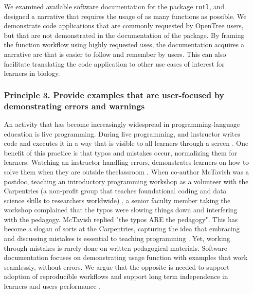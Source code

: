 \documentclass[12pt]{article}
\begin{document}
We examined available software documentation for the package \texttt{rotl}, and designed a narrative that requires the usage of as many functions as possible.
We demonstrate code applications that are commonly requested by OpenTree users, but that are not demonstrated in the documentation of the package.
By framing the function workflow using highly requested uses, the documentation acquires a narrative arc that is easier to follow and remember by users. This can also facilitate translating the code application to other use cases of interest for learners in biology.


\subsubsection*{Principle 3. Provide examples that are user-focused by demonstrating errors and warnings}


An activity that has become increasingly widespread in programming-language education is live programming. During live programming, and instructor writes code and executes it in a way that is visible to all learners through a screen \citep{guzdial2013lure, selvaraj2021live}.
One benefit of this practice is that typos and mistakes occur, normalizing them for learners. 
Watching an instructor handling errors, demonstrates learners on how to solve them when they are outside theclassroom \citep{shannon2015live, nederbragt2020ten}.
When co-author McTavish was a postdoc, teaching an introductory programming workshop as a volunteer with the Carpentries (a non-profit group that teaches foundational coding and data science skills to researchers worldwide) \citep{wilson2006swc, SWCwebsite},
a senior faculty member taking the workshop complained that the typos were slowing things down and interfering with the pedagogy.
McTavish replied "the typos ARE the pedagogy".
This has become a slogan of sorts at the Carpentries, capturing the idea that embracing and discussing mistakes is essential to teaching programming \citep{wilson2019teaching}.
Yet, working through mistakes is rarely done on written pedagogical materials.
Software documentation focuses on demonstrating usage function with examples that work seamlessly, without errors. 
We argue that the opposite is needed to support adoption of reproducible workflows and support long term independence in learners and users performance \citep{gaspar2007restoring, steele2014error}.
\end{document}
